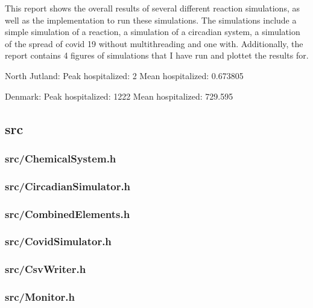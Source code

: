 This report shows the overall results of several different reaction simulations, as well as the implementation to run these simulations. 
The simulations include a simple simulation of a reaction, a simulation of a circadian system, a simulation of the spread of covid 19 without multithreading and one with.
Additionally, the report contains 4 figures of simulations that I have run and plottet the results for.



North Jutland:
Peak hospitalized: 2
Mean hospitalized: 0.673805

Denmark:
Peak hospitalized: 1222
Mean hospitalized: 729.595


\newpage
\subsection{src}
\subsubsection{src/ChemicalSystem.h}

\newpage
\subsubsection{src/CircadianSimulator.h}

\newpage
\subsubsection{src/CombinedElements.h}

\newpage
\subsubsection{src/CovidSimulator.h}

\newpage
\subsubsection{src/CsvWriter.h}

\newpage
\subsubsection{src/Monitor.h}

\newpage
